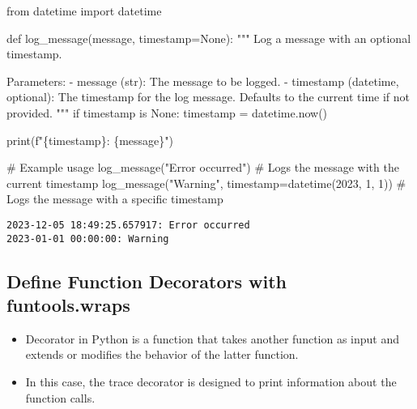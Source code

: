 \documentclass[
]{report}
\newenvironment{Shaded}{\begin{snugshade}}{\end{snugshade}}
\newcommand{\BuiltInTok}[1]{\textcolor[rgb]{0.00,0.23,0.31}{#1}}
\newcommand{\CommentTok}[1]{\textcolor[rgb]{0.37,0.37,0.37}{#1}}
\newcommand{\ControlFlowTok}[1]{\textcolor[rgb]{0.00,0.23,0.31}{#1}}
\newcommand{\DecValTok}[1]{\textcolor[rgb]{0.68,0.00,0.00}{#1}}
\newcommand{\ImportTok}[1]{\textcolor[rgb]{0.00,0.46,0.62}{#1}}
\newcommand{\KeywordTok}[1]{\textcolor[rgb]{0.00,0.23,0.31}{#1}}
\newcommand{\NormalTok}[1]{\textcolor[rgb]{0.00,0.23,0.31}{#1}}
\newcommand{\OperatorTok}[1]{\textcolor[rgb]{0.37,0.37,0.37}{#1}}
\newcommand{\SpecialCharTok}[1]{\textcolor[rgb]{0.37,0.37,0.37}{#1}}
\newcommand{\SpecialStringTok}[1]{\textcolor[rgb]{0.13,0.47,0.30}{#1}}
\newcommand{\StringTok}[1]{\textcolor[rgb]{0.13,0.47,0.30}{#1}}
\newcommand{\VariableTok}[1]{\textcolor[rgb]{0.07,0.07,0.07}{#1}}
\providecommand{\tightlist}{%
  \setlength{\itemsep}{0pt}\setlength{\parskip}{0pt}}\usepackage{longtable,booktabs,array}
\begin{document}
\begin{Shaded}
\begin{Highlighting}[]
\ImportTok{from}\NormalTok{ datetime }\ImportTok{import}\NormalTok{ datetime}

\KeywordTok{def}\NormalTok{ log\_message(message, timestamp}\OperatorTok{=}\VariableTok{None}\NormalTok{):}
    \CommentTok{"""}
\CommentTok{    Log a message with an optional timestamp.}

\CommentTok{    Parameters:}
\CommentTok{    {-} message (str): The message to be logged.}
\CommentTok{    {-} timestamp (datetime, optional): The timestamp for the log message.}
\CommentTok{      Defaults to the current time if not provided.}
\CommentTok{    """}
    \ControlFlowTok{if}\NormalTok{ timestamp }\KeywordTok{is} \VariableTok{None}\NormalTok{:}
\NormalTok{        timestamp }\OperatorTok{=}\NormalTok{ datetime.now()}

    \BuiltInTok{print}\NormalTok{(}\SpecialStringTok{f"}\SpecialCharTok{\{}\NormalTok{timestamp}\SpecialCharTok{\}}\SpecialStringTok{: }\SpecialCharTok{\{}\NormalTok{message}\SpecialCharTok{\}}\SpecialStringTok{"}\NormalTok{)}

\CommentTok{\# Example usage}
\NormalTok{log\_message(}\StringTok{"Error occurred"}\NormalTok{)  }\CommentTok{\# Logs the message with the current timestamp}
\NormalTok{log\_message(}\StringTok{"Warning"}\NormalTok{, timestamp}\OperatorTok{=}\NormalTok{datetime(}\DecValTok{2023}\NormalTok{, }\DecValTok{1}\NormalTok{, }\DecValTok{1}\NormalTok{))  }\CommentTok{\# Logs the message with a specific timestamp}
\end{Highlighting}
\end{Shaded}

\begin{verbatim}
2023-12-05 18:49:25.657917: Error occurred
2023-01-01 00:00:00: Warning
\end{verbatim}

\hypertarget{define-function-decorators-with-funtools.wraps}{%
\subsection{Define Function Decorators with
funtools.wraps}\label{define-function-decorators-with-funtools.wraps}}

\begin{itemize}
\tightlist
\item
  Decorator in Python is a function that takes another function as input
  and extends or modifies the behavior of the latter function.
\item
  In this case, the trace decorator is designed to print information
  about the function calls.
\end{itemize}
\end{document}

